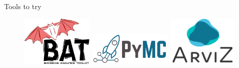 \documentclass[
aspectratio=169,
14pt,
professionalfonts
]{beamer}
\begin{document}
\begin{frame}{Tools to try}
\begin{figure}
    \center
    \href{
        https://github.com/bat
    }{\includegraphics[width=0.3\textwidth]{../plots/bat.pdf}}
    \hfill
    \href{
        https://www.pymc.io/
    }{\includegraphics[width=0.35\textwidth]{../plots/pymc.png}}
    \hfill
    \href{
        https://python.arviz.org/en/stable/
    }{\includegraphics[width=0.3\textwidth]{../plots/arviz.png}}
\end{figure}
\end{frame}




\end{document}
